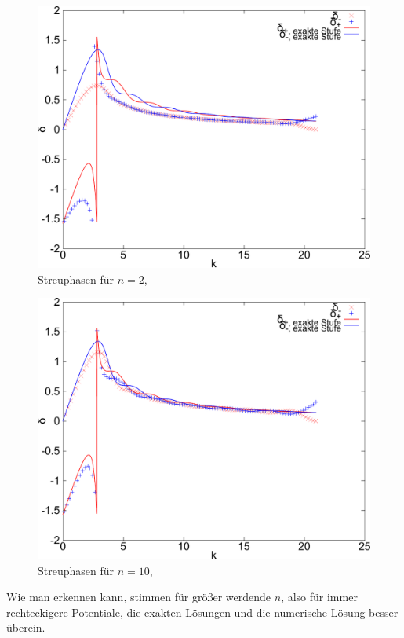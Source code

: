 \begin{figure}[htb]
  \centering
  \includegraphics[width=0.8\columnwidth,keepaspectratio]{../tmp/71a_n2-crop}
  \caption{Streuphasen für $n=2$, }
  \label{fig:n2}
\end{figure}

\begin{figure}[htb]
  \centering
  \includegraphics[width=0.8\columnwidth,keepaspectratio]{../tmp/71a_n10-crop}
  \caption{Streuphasen für $n=10$, }
  \label{fig:n10}
\end{figure}

Wie man erkennen kann, stimmen für größer werdende $n$, also für immer rechteckigere
Potentiale, die exakten Lösungen und die numerische Lösung besser überein.

